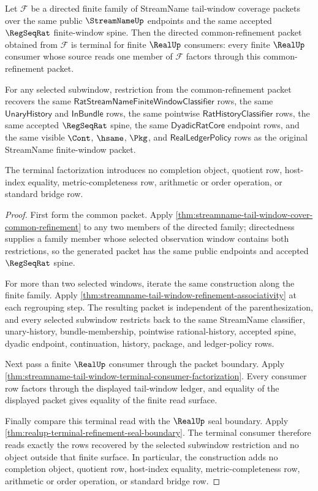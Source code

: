 \begin{theorem}
\label{thm:realup-streamname-regseqrat-directed-refinement-terminality}
Let $\mathcal F$ be a directed finite family of StreamName tail-window
coverage packets over the same public $\StreamNameUp$ endpoints and the same
accepted $\RegSeqRat$ finite-window spine. Then the directed common-refinement
packet obtained from $\mathcal F$ is terminal for finite $\RealUp$ consumers:
every finite $\RealUp$ consumer whose source reads one member of
$\mathcal F$ factors through this common-refinement packet.

For any selected subwindow, restriction from the common-refinement packet
recovers the same $\mathsf{RatStreamNameFiniteWindowClassifier}$ rows, the
same $\mathsf{UnaryHistory}$ and $\mathsf{InBundle}$ rows, the same pointwise
$\mathsf{RatHistoryClassifier}$ rows, the same accepted $\RegSeqRat$ spine,
the same $\mathsf{DyadicRatCore}$ endpoint rows, and the same visible
$\Cont$, $\hsame$, $\Pkg$, and $\mathsf{RealLedgerPolicy}$ rows as the
original StreamName finite-window packet.

The terminal factorization introduces no completion object, quotient row,
host-index equality, metric-completeness row, arithmetic or order operation,
or standard bridge row.
\end{theorem}
\begin{proof}
First form the common packet. Apply
\autoref{thm:streamname-tail-window-cover-common-refinement} to any two
members of the directed family; directedness supplies a family member whose
selected observation window contains both restrictions, so the generated
packet has the same public endpoints and accepted $\RegSeqRat$ spine.

For more than two selected windows, iterate the same construction along the
finite family. Apply
\autoref{thm:streamname-tail-window-refinement-associativity} at each regrouping
step. The resulting packet is independent of the parenthesization, and every
selected subwindow restricts back to the same StreamName classifier,
unary-history, bundle-membership, pointwise rational-history, accepted spine,
dyadic endpoint, continuation, history, package, and ledger-policy rows.

Next pass a finite $\RealUp$ consumer through the packet boundary. Apply
\autoref{thm:streamname-tail-window-terminal-consumer-factorization}. Every
consumer row factors through the displayed tail-window ledger, and equality of
the displayed packet gives equality of the finite read surface.

Finally compare this terminal read with the $\RealUp$ seal boundary. Apply
\autoref{thm:realup-terminal-refinement-seal-boundary}. The terminal consumer
therefore reads exactly the rows recovered by the selected subwindow
restriction and no object outside that finite surface. In particular, the
construction adds no completion object, quotient row, host-index equality,
metric-completeness row, arithmetic or order operation, or standard bridge
row.
\end{proof}

